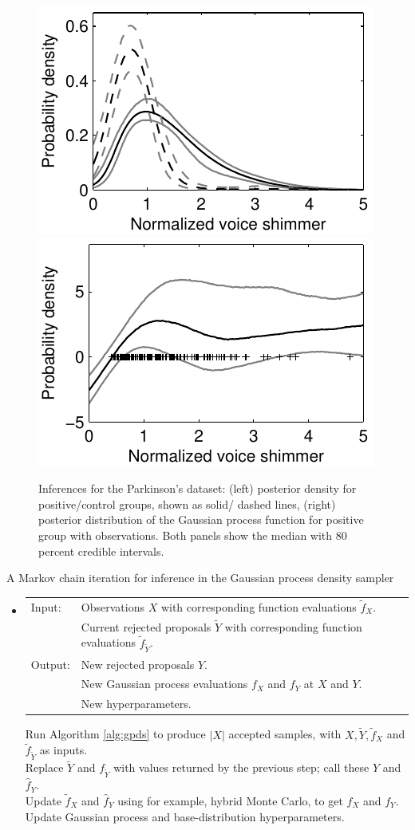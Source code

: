   \begin{figure}
  \centering
    \includegraphics[width=.35\textwidth]{figs/plot_parkinson_new.pdf}
    \includegraphics[width=.35\textwidth]{figs/plot_parkinson_int_new.pdf}
\caption{Inferences for the Parkinson's dataset: (left) posterior density for positive/control groups, shown as 
solid/ dashed lines, (right) posterior distribution of the Gaussian process function for
positive group with observations. Both panels show the median with $80$ percent credible intervals.}
  \label{fig:plot_glx}
  \end{figure}
{
\begin{algo}{A Markov chain iteration for inference in the Gaussian process density sampler}\label{alg:gpds_mcmc}
  \begin{itemize}
    \item[]
\begin{tabular}{p{.9cm}p{12.2cm}}
{Input:}  & Observations $X$ with corresponding function evaluations $\tilde{f}_X$. \\
          & Current rejected proposals $\tilde{Y}$ with corresponding function evaluations $\tilde{f}_{\tilde{Y}}$. \\
{Output:} & New rejected proposals $Y$. \\ %
                 & New Gaussian process evaluations $f_X$ and $f_Y$ at $X$ and $Y$. \\
                 & New hyperparameters. \\
\end{tabular}
\begin{tabbing}
  \enspace Run Algorithm \ref{alg:gpds} to produce $|X|$ accepted samples, with $X, \tilde{Y}, \tilde{f}_X$ and $\tilde{f}_{\tilde{Y}}$ as inputs. \\
  \enspace Replace $\tilde{Y}$ and $f_{\tilde{Y}}$ with values returned by the previous step; call these $Y$ and $\hat{f}_Y$.\\
  \enspace Update $\tilde{f}_X$ and $\hat{f}_Y$ using for example, hybrid Monte Carlo, to get $f_X$ and $f_Y$.\\
  \enspace Update Gaussian process and base-distribution hyperparameters.
\end{tabbing}
  \end{itemize}
\end{algo}
}


